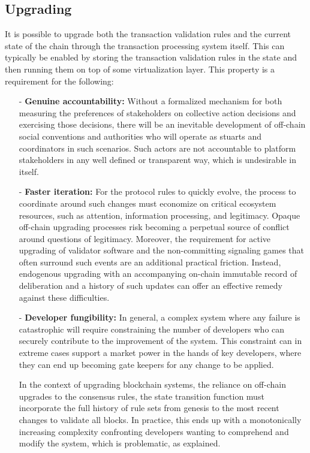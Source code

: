\documentclass{article}
\begin{document}
\subsection{Upgrading}

It is possible to upgrade both the transaction validation rules and the current state of the chain through the transaction processing system itself. This can typically be enabled by storing the transaction validation rules in the state and then running them on top of some virtualization layer. This property is a requirement for the following:

\begin{itemize}

    \item[-] \textbf{Genuine accountability:} Without a formalized mechanism for both measuring the preferences of stakeholders on collective action decisions and exercising those decisions, there will be an inevitable development of off-chain social conventions and authorities who will operate as stuarts and coordinators in such scenarios. Such actors are not accountable to platform stakeholders in any well defined or transparent way, which is undesirable in itself.

    \item[-] \textbf{Faster iteration:} For the protocol rules to quickly evolve, the process to coordinate around such changes must economize on critical ecosystem resources, such as attention, information processing, and legitimacy. Opaque off-chain upgrading processes risk becoming a perpetual source of conflict around questions of legitimacy. Moreover, the requirement for active upgrading of validator software and the non-committing signaling games that often surround such events are an additional practical friction. Instead, endogenous upgrading with an accompanying on-chain immutable record of deliberation and a history of such updates can offer an effective remedy against these difficulties.

    \item[-] \textbf{Developer fungibility:} In general, a complex system where any failure is catastrophic will require constraining the number of developers who can securely contribute to the improvement of the system. This constraint can in extreme cases support a market power in the hands of key developers, where they can end up becoming gate keepers for any change to be applied.

    In the context of upgrading blockchain systems, the reliance on off-chain upgrades to the consensus rules, the state transition function must incorporate the full history of rule sets from genesis to the most recent changes to validate all blocks. In practice, this ends up with a monotonically increasing complexity confronting developers wanting to comprehend and modify the system, which is problematic, as explained.

\end{itemize}
\end{document}
